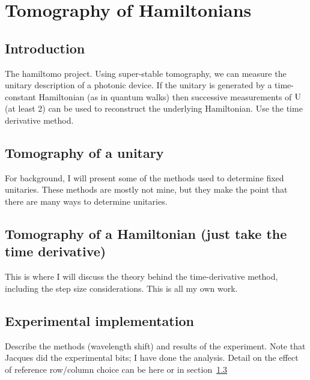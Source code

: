\chapter{Tomography of Hamiltonians}
\label{ch:Hamiltomo}

\section{Introduction}
\label{sec:HTIntro}
The hamiltomo project. Using super-stable tomography, we can measure the unitary
description of a photonic device. If the unitary is generated by a time-constant
Hamiltonian (as in quantum walks) then successive measurements of \(\mathrm{U}\)
(at least 2) can be used to reconstruct the underlying Hamiltonian. Use the time
derivative method.

\section{Tomography of a unitary}
\label{sec:SST}
For background, I will present some of the methods used to determine fixed
unitaries. These methods are mostly not mine, but they make the point that there
are many ways to determine unitaries.

\section{Tomography of a Hamiltonian (just take the time derivative)}
\label{sec:Hamiltomo}
This is where I will discuss the theory behind the time-derivative method,
including the step size considerations. This is all my own work.

\section{Experimental implementation}
\label{sec:HTExperiment}
Describe the methods (wavelength shift) and results of the experiment. Note that
Jacques did the experimental bits; I have done the analysis. Detail on the
effect of reference row/column choice can be here or in
section~\ref{sec:Hamiltomo}

